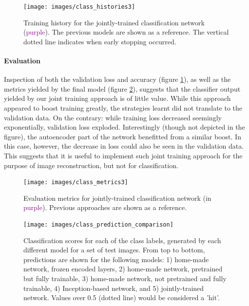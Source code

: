 \begin{figure}[!htbp]
	\begin{center}
		\texttt{[image: images/class\_histories3]}
		\caption{Training history for the jointly-trained classification network (\textcolor{purple}{purple}). The previous models are shown as a reference. The vertical dotted line indicates when early stopping occurred.}
		\label{fig:class_histories3}
	\end{center}
\end{figure}

\paragraph{Evaluation}
Inspection of both the validation loss and accuracy (figure \ref{fig:class_histories3}), as well as the metrics yielded by the final model (figure \ref{fig:class_metrics3}), suggests that the classifier output yielded by our joint training approach is of little value. While this approach appeared to boost training greatly, the strategies learnt did not translate to the validation data.  On the contrary: while training loss decreased seemingly exponentially, validation loss exploded. Interestingly (though not depicted in the figure), the autoencoder part of the network benefitted from a similar boost. In this case, however, the decrease in loss could also be seen in the validation data. This suggests that it is useful to implement such joint training approach for the purpose of image reconstruction, but not for classification. 


\begin{figure}[!htbp]
	\begin{center}
		\texttt{[image: images/class\_metrics3]}
		\caption{Evaluation metrics for jointly-trained classification network (in \textcolor{purple}{purple}). Previous approaches are shown as a reference.}
		\label{fig:class_metrics3}
	\end{center}
\end{figure}


\begin{figure}[!htbp]
	\begin{center}
		\texttt{[image: images/class\_prediction\_comparison]}
		\caption{Classification scores for each of the class labels, generated by each different model for a set of test images. From top to bottom, predictions are shown for the following models: 1) home-made network, frozen encoded layers, 2) home-made network, pretrained but fully trainable, 3) home-made network, not pretrained and fully trainable, 4) Inception-based network, and 5) jointly-trained network.  Values over 0.5 (dotted line) would be considered a 'hit'.}
		\label{fig:class_prediction}
	\end{center}
\end{figure}



